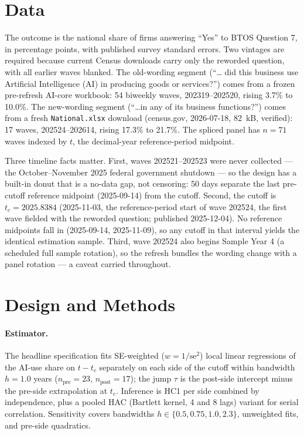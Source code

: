 \documentclass[11pt]{article}
\begin{document}
\section{Data}\label{sec:data}

The outcome is the national share of firms answering ``Yes'' to BTOS Question
7, in percentage points, with published survey standard errors. Two vintages
are required because current Census downloads carry only the reworded
question, with all earlier waves blanked. The old-wording segment (``\ldots
did this business use Artificial Intelligence (AI) in producing goods or
services?'') comes from a frozen pre-refresh AI-core workbook: 54 biweekly
waves, 202319--202520, rising 3.7\% to 10.0\%. The new-wording segment
(``\ldots in any of its business functions?'') comes from a fresh
\texttt{National.xlsx} download (census.gov, 2026-07-18, 82~kB, verified):
17 waves, 202524--202614, rising 17.3\% to 21.7\%. The spliced panel has
$n=71$ waves indexed by $t$, the decimal-year reference-period midpoint.

Three timeline facts matter. First, waves 202521--202523 were never collected
--- the October--November 2025 federal government shutdown --- so the design
has a built-in donut that is a no-data gap, not censoring: 50 days separate
the last pre-cutoff reference midpoint (2025-09-14) from the cutoff. Second,
the cutoff is $t_c = 2025.8384$ (2025-11-03, the reference-period start of
wave 202524, the first wave fielded with the reworded question; published
2025-12-04). No reference midpoints fall in (2025-09-14, 2025-11-09), so any
cutoff in that interval yields the identical estimation sample. Third, wave
202524 also begins Sample Year 4 (a scheduled full sample rotation), so the
refresh bundles the wording change with a panel rotation --- a caveat carried
throughout.

\section{Design and Methods}\label{sec:methods}

\paragraph{Estimator.} The headline specification fits SE-weighted
($w=1/\mathrm{se}^2$) local linear regressions of the AI-use share on
$t - t_c$ separately on each side of the cutoff within bandwidth $h=1.0$
years ($n_{\text{pre}}=23$, $n_{\text{post}}=17$); the jump $\tau$ is the
post-side intercept minus the pre-side extrapolation at $t_c$. Inference is
HC1 per side combined by independence, plus a pooled HAC (Bartlett kernel, 4
and 8 lags) variant for serial correlation. Sensitivity covers bandwidths
$h \in \{0.5, 0.75, 1.0, 2.3\}$, unweighted fits, and pre-side quadratics.
\end{document}
